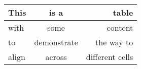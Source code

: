 \begin{longtable}[c]{@{}lcr@{}}
\toprule
This & is a & table\tabularnewline
\midrule
\endhead
with & some & content\tabularnewline
to & demonstrate & the way to\tabularnewline
align & across & different cells\tabularnewline
\bottomrule
\end{longtable}
